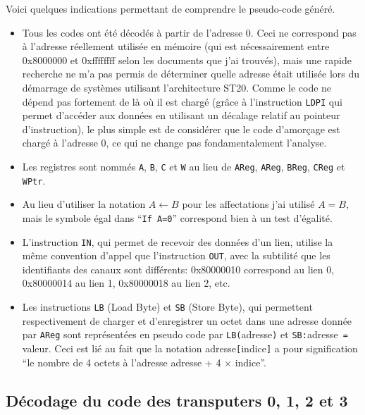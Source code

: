 \documentclass[a4paper,10pt]{article}
\begin{document}
Voici quelques indications permettant de comprendre le pseudo-code généré.
\begin{itemize}
  \item Tous les codes ont été décodés à partir de l'adresse 0. Ceci ne correspond pas à l'adresse réellement utilisée en mémoire (qui est nécessairement entre 0x8000000 et 0xffffffff selon les documents que j'ai trouvés), mais une rapide recherche ne m'a pas permis de déterminer quelle adresse était utilisée lors du démarrage de systèmes utilisant l'architecture ST20. Comme le code ne dépend pas fortement de là où il est chargé (grâce à l'instruction \texttt{LDPI} qui permet d'accéder aux données en utilisant un décalage relatif au pointeur d'instruction), le plus simple est de considérer que le code d'amorçage est chargé à l'adresse 0, ce qui ne change pas fondamentalement l'analyse.
  \item Les registres sont nommés \texttt{A}, \texttt{B}, \texttt{C} et \texttt{W} au lieu de \texttt{AReg}, \texttt{AReg}, \texttt{BReg}, \texttt{CReg} et \texttt{WPtr}.
  \item Au lieu d'utiliser la notation $A \leftarrow B$ pour les affectations j'ai utilisé $A = B$, mais le symbole égal dans ``\texttt{If A=0}'' correspond bien à un test d'égalité.
  \item L'instruction \texttt{IN}, qui permet de recevoir des données d'un lien, utilise la même convention d'appel que l'instruction \texttt{OUT}, avec la subtilité que les identifiants des canaux sont différents: 0x80000010 correspond au lien 0, 0x80000014 au lien 1, 0x80000018 au lien 2, etc.
  \item Les instructions \texttt{LB} (Load Byte) et \texttt{SB} (Store Byte), qui permettent respectivement de charger et d'enregistrer un octet dans une adresse donnée par \texttt{AReg} sont représentées en pseudo code par \texttt{LB(}adresse\texttt{)} et \texttt{SB:}adresse\texttt{ = }valeur. Ceci est lié au fait que la notation adresse\texttt{[}indice\texttt{]} a pour signification ``le nombre de 4 octets à l'adresse adresse + 4 $\times$ indice''.
\end{itemize}

\subsection{Décodage du code des transputers 0, 1, 2 et 3}
\end{document}
